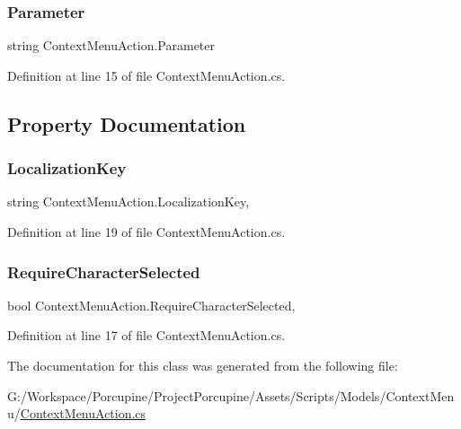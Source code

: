 \subsubsection{\texorpdfstring{Parameter}{Parameter}}
{\footnotesize\ttfamily string Context\+Menu\+Action.\+Parameter}



Definition at line 15 of file Context\+Menu\+Action.\+cs.



\subsection{Property Documentation}
\mbox{\label{class_context_menu_action_a0f5cf662245a05c9b723051118658ccb}} 
\subsubsection{\texorpdfstring{Localization\+Key}{LocalizationKey}}
{\footnotesize\ttfamily string Context\+Menu\+Action.\+Localization\+Key\hspace{0.3cm}{\ttfamily [get]}, {\ttfamily [set]}}



Definition at line 19 of file Context\+Menu\+Action.\+cs.

\mbox{\label{class_context_menu_action_a326d5fd6a09c3dbdaca2e75de5b35f21}} 
\subsubsection{\texorpdfstring{Require\+Character\+Selected}{RequireCharacterSelected}}
{\footnotesize\ttfamily bool Context\+Menu\+Action.\+Require\+Character\+Selected\hspace{0.3cm}{\ttfamily [get]}, {\ttfamily [set]}}



Definition at line 17 of file Context\+Menu\+Action.\+cs.



The documentation for this class was generated from the following file\+:\begin{DoxyCompactItemize}
\item 
G\+:/\+Workspace/\+Porcupine/\+Project\+Porcupine/\+Assets/\+Scripts/\+Models/\+Context\+Menu/\hyperlink{_context_menu_action_8cs}{Context\+Menu\+Action.\+cs}\end{DoxyCompactItemize}
